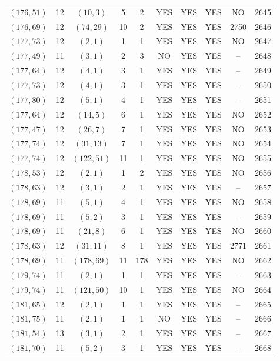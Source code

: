 \begin{longtable}{|c|c|c|c|c|c|c|c|c|c|}
$(176, 51)$ & 12 & $(10, 3)$ & 5 & 2 & YES & YES & YES & NO & 2645\\
$(176, 69)$ & 12 & $(74, 29)$ & 10 & 2 & YES & YES & YES & 2750 & 2646\\
$(177, 73)$ & 12 & $(2, 1)$ & 1 & 1 & YES & YES & YES & NO & 2647\\
$(177, 49)$ & 11 & $(3, 1)$ & 2 & 3 & NO & YES & YES & -- & 2648\\
$(177, 64)$ & 12 & $(4, 1)$ & 3 & 1 & YES & YES & YES & -- & 2649\\
$(177, 73)$ & 12 & $(4, 1)$ & 3 & 1 & YES & YES & YES & -- & 2650\\
$(177, 80)$ & 12 & $(5, 1)$ & 4 & 1 & YES & YES & YES & -- & 2651\\
$(177, 64)$ & 12 & $(14, 5)$ & 6 & 1 & YES & YES & YES & NO & 2652\\
$(177, 47)$ & 12 & $(26, 7)$ & 7 & 1 & YES & YES & YES & NO & 2653\\
$(177, 74)$ & 12 & $(31, 13)$ & 7 & 1 & YES & YES & YES & NO & 2654\\
$(177, 74)$ & 12 & $(122, 51)$ & 11 & 1 & YES & YES & YES & NO & 2655\\
$(178, 53)$ & 12 & $(2, 1)$ & 1 & 2 & YES & YES & YES & NO & 2656\\
$(178, 63)$ & 12 & $(3, 1)$ & 2 & 1 & YES & YES & YES & -- & 2657\\
$(178, 69)$ & 11 & $(5, 1)$ & 4 & 1 & YES & YES & YES & NO & 2658\\
$(178, 69)$ & 11 & $(5, 2)$ & 3 & 1 & YES & YES & YES & -- & 2659\\
$(178, 69)$ & 11 & $(21, 8)$ & 6 & 1 & YES & YES & YES & NO & 2660\\
$(178, 63)$ & 12 & $(31, 11)$ & 8 & 1 & YES & YES & YES & 2771 & 2661\\
$(178, 69)$ & 11 & $(178, 69)$ & 11 & 178 & YES & YES & YES & NO & 2662\\
$(179, 74)$ & 11 & $(2, 1)$ & 1 & 1 & YES & YES & YES & -- & 2663\\
$(179, 74)$ & 11 & $(121, 50)$ & 10 & 1 & YES & YES & YES & NO & 2664\\
$(181, 65)$ & 12 & $(2, 1)$ & 1 & 1 & YES & YES & YES & -- & 2665\\
$(181, 75)$ & 11 & $(2, 1)$ & 1 & 1 & NO & YES & YES & -- & 2666\\
$(181, 54)$ & 13 & $(3, 1)$ & 2 & 1 & YES & YES & YES & -- & 2667\\
$(181, 70)$ & 11 & $(5, 2)$ & 3 & 1 & YES & YES & YES & -- & 2668\\

\end{longtable}
